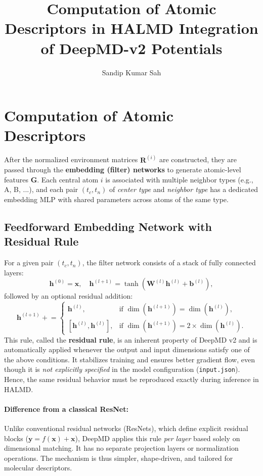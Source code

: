 \documentclass[12pt,a4paper]{article}
\title{Computation of Atomic Descriptors in HALMD Integration of DeepMD-v2 Potentials}
\author{Sandip Kumar Sah}
\date{}
\begin{document}
\maketitle

\section*{Computation of Atomic Descriptors}

After the normalized environment matrices $\mathbf{R}^{(i)}$ are constructed, they are passed through the \textbf{embedding (filter) networks} to generate atomic-level features $\mathbf{G}$.  
Each central atom $i$ is associated with multiple neighbor types (e.g., A, B, ...), and each pair $(t_c, t_n)$ of \textit{center type} and \textit{neighbor type} has a dedicated embedding MLP with shared parameters across atoms of the same type.

\subsection*{Feedforward Embedding Network with Residual Rule}

For a given pair $(t_c, t_n)$, the filter network consists of a stack of fully connected layers:
\[
\mathbf{h}^{(0)} = \mathbf{x}, \quad
\mathbf{h}^{(l+1)} = \tanh(\mathbf{W}^{(l)} \mathbf{h}^{(l)} + \mathbf{b}^{(l)}),
\]
followed by an optional residual addition:
\[
\mathbf{h}^{(l+1)} \mathrel{+}= 
\begin{cases}
\mathbf{h}^{(l)}, & \text{if } \dim(\mathbf{h}^{(l+1)}) = \dim(\mathbf{h}^{(l)}),\\[6pt]
[\mathbf{h}^{(l)}, \mathbf{h}^{(l)}], & \text{if } \dim(\mathbf{h}^{(l+1)}) = 2\times \dim(\mathbf{h}^{(l)}).
\end{cases}
\]
This rule, called the \textbf{residual rule}, is an inherent property of DeepMD v2 and is automatically applied whenever the output and input dimensions satisfy one of the above conditions.  
It stabilizes training and ensures better gradient flow, even though it is \textit{not explicitly specified} in the model configuration (\texttt{input.json}).  
Hence, the same residual behavior must be reproduced exactly during inference in HALMD.

\paragraph{Difference from a classical ResNet:}
Unlike conventional residual networks (ResNets), which define explicit residual blocks (\( \mathbf{y} = f(\mathbf{x}) + \mathbf{x} \)), DeepMD applies this rule \textit{per layer} based solely on dimensional matching.  
It has no separate projection layers or normalization operations.  
The mechanism is thus simpler, shape-driven, and tailored for molecular descriptors.
\end{document}

